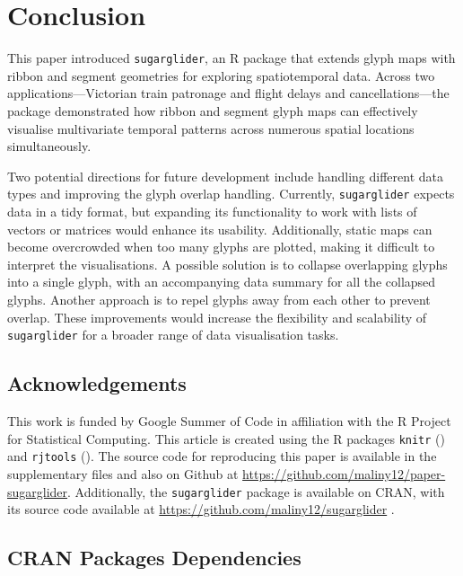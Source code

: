 \section{Conclusion}\label{conclusion}

This paper introduced \texttt{sugarglider}, an R package that extends glyph maps with ribbon and segment geometries for exploring spatiotemporal data. Across two applications---Victorian train patronage and flight delays and cancellations---the package demonstrated how ribbon and segment glyph maps can effectively visualise multivariate temporal patterns across numerous spatial locations simultaneously.

Two potential directions for future development include handling different data types and improving the glyph overlap handling. Currently, \texttt{sugarglider} expects data in a tidy format, but expanding its functionality to work with lists of vectors or matrices would enhance its usability. Additionally, static maps can become overcrowded when too many glyphs are plotted, making it difficult to interpret the visualisations. A possible solution is to collapse overlapping glyphs into a single glyph, with an accompanying data summary for all the collapsed glyphs. Another approach is to repel glyphs away from each other to prevent overlap. These improvements would increase the flexibility and scalability of \texttt{sugarglider} for a broader range of data visualisation tasks.

\subsection{Acknowledgements}\label{acknowledgements}

This work is funded by Google Summer of Code in affiliation with the R Project for Statistical Computing. This article is created using the R packages \texttt{knitr} (\citet{knitr}) and \texttt{rjtools} (\citet{rjtools}). The source code for reproducing this paper is available in the supplementary files and also on Github at \url{https://github.com/maliny12/paper-sugarglider}. Additionally, the \texttt{sugarglider} package is available on CRAN, with its source code available at \url{https://github.com/maliny12/sugarglider} .

\subsection{CRAN Packages Dependencies}\label{cran-packages-dependencies}

